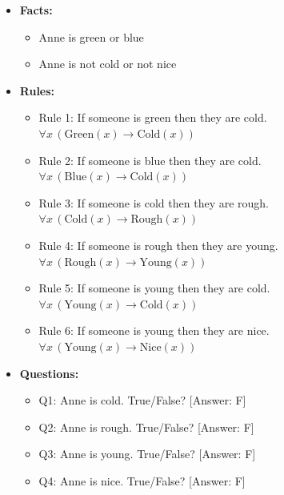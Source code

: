 \documentclass{article}
\begin{document}
\begin{itemize}
    \item \textbf{Facts:}
    \begin{itemize}
        \item Anne is green or blue
        \item Anne is not cold or not nice
    \end{itemize}

    \item \textbf{Rules:}
    \begin{itemize}
        \item Rule 1: If someone is green then they are cold. $\forall x \, (\text{Green}(x) \rightarrow \text{Cold}(x))$
        \item Rule 2: If someone is blue then they are cold. $\forall x \, (\text{Blue}(x) \rightarrow \text{Cold}(x))$
        \item Rule 3: If someone is cold then they are rough. $\forall x \, (\text{Cold}(x) \rightarrow \text{Rough}(x))$
        \item Rule 4: If someone is rough then they are young. $\forall x \, (\text{Rough}(x) \rightarrow \text{Young}(x))$
        \item Rule 5: If someone is young then they are cold. $\forall x \, (\text{Young}(x) \rightarrow \text{Cold}(x))$
        \item Rule 6: If someone is young then they are nice. $\forall x \, (\text{Young}(x) \rightarrow \text{Nice}(x))$

    \end{itemize}

    \item \textbf{Questions:}
    \begin{itemize}
        \item Q1: Anne is cold. True/False? [Answer: F]
        \item Q2: Anne is rough. True/False? [Answer: F]
        \item Q3: Anne is young. True/False? [Answer: F]
        \item Q4: Anne is nice. True/False? [Answer: F]
    \end{itemize}
\end{itemize}
\end{document}
